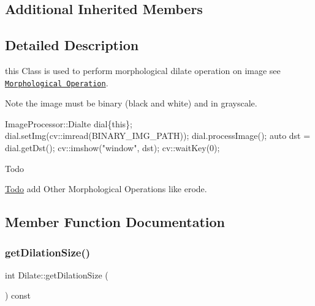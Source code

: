 \subsection*{Additional Inherited Members}


\subsection{Detailed Description}
this Class is used to perform morphological dilate operation on image see \href{https://docs.opencv.org/trunk/d9/d61/tutorial_py_morphological_ops.html}{\tt Morphological Operation}. 

\begin{DoxyNote}{Note}
the image must be binary (black and white) and in grayscale.
\end{DoxyNote}

\begin{DoxyCode}
 ImageProcessor::Dialte dial\{\textcolor{keyword}{this}\};
dial.setImg(cv::imread(BINARY\_IMG\_PATH));
dial.processImage();
\textcolor{keyword}{auto} dst = dial.getDst();
cv::imshow(\textcolor{stringliteral}{"window"}, dst);
cv::waitKey(0);
\end{DoxyCode}


\begin{DoxyRefDesc}{Todo}
\item[\hyperlink{todo__todo000003}{Todo}]add Other Morphological Operations like erode. \end{DoxyRefDesc}


\subsection{Member Function Documentation}
\mbox{\label{class_image_processor_1_1_dilate_a52a32329eb187040162c980d72544828}} 
\subsubsection{\texorpdfstring{get\+Dilation\+Size()}{getDilationSize()}}
{\footnotesize\ttfamily int Dilate\+::get\+Dilation\+Size (\begin{DoxyParamCaption}{ }\end{DoxyParamCaption}) const}



